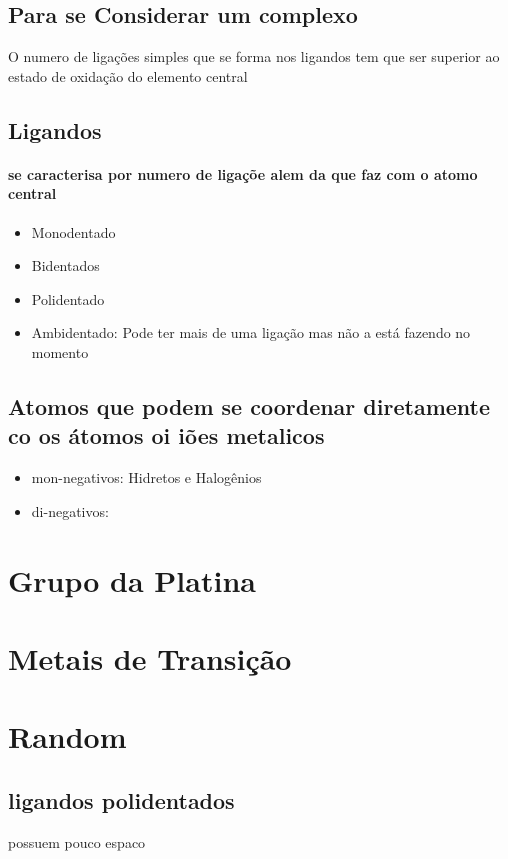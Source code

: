 \documentclass[12pt]{article}
\begin{document}
\subsection{Para se Considerar um complexo}
O numero de ligações simples que se forma nos ligandos tem que ser superior ao estado de oxidação do elemento central

\subsection{Ligandos}
\paragraph{se caracterisa por numero de ligaçõe alem da que faz com o atomo central}
\begin{itemize}
\item Monodentado
\item Bidentados
\item Polidentado
\item Ambidentado: Pode ter mais de uma ligação mas não a está fazendo no momento
\end{itemize}

\subsection{Atomos que podem se coordenar diretamente co os átomos oi iões metalicos}
\begin{itemize}
\item mon-negativos: Hidretos e Halogênios
\item di-negativos: 
\end{itemize}



\section{Grupo da Platina}

\section{Metais de Transição}



\section{Random}

\subsection{ligandos polidentados}
possuem pouco espaco
\end{document}
